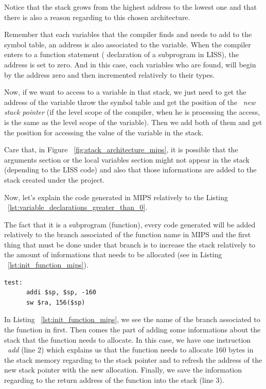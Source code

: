 \documentclass[
  oneside,
  11pt, a4paper,
  footinclude=true,
  headinclude=true,
  cleardoublepage=empty
]{scrbook}
\begin{document}
Notice that the stack grows from the highest address to the lowest one and that there is also a reason regarding to this chosen architecture.

Remember that each variables that the compiler finds and needs to add to the symbol table, an address is also associated to the variable. When the compiler enters to a function statement ( declaration of a subprogram in LISS), the address is set to zero. And in this case, each variables who are found, will begin by the address zero and then incremented relatively to their types.

Now, if we want to access to a variable in that stack, we just need to get the address of the variable throw the symbol table and get the position of the ~\textit{new stack pointer} (if the level scope of the compiler, when he is processing the access, is the same as the level scope of the variable). Then we add both of them and get the position for accessing the value of the variable in the stack.

Care that, in Figure ~\ref{fig:stack_architecture_mips}, it is possible that the arguments section or the local variables section might not appear in the stack (depending to the LISS code) and also that those informations are added to the stack created under the project.

Now, let's explain the code generated in MIPS relatively to the Listing ~\ref{lst:variable_declarations_greater_than_0}.

The fact that it is a subprogram (function), every code generated will be added relatively to the branch associated of the function name in MIPS and the first thing that must be done under that branch is to increase the stack relatively to the amount of informations that needs to be allocated (see in Listing ~\ref{lst:init_function_mips}).

\begin{lstlisting}[caption={Initialization of MIPS code generated for a function},label={lst:init_function_mips}]
    test: 
      addi $sp, $sp, -160		
      sw $ra, 156($sp)
\end{lstlisting}

In Listing ~\ref{lst:init_function_mips}, we see the name of the branch associated to the function in first. Then comes the part of adding some informations about the stack that the function needs to allocate. In this case, we have one instruction ~\textit{add} (line 2) which explains us that the function needs to allocate 160 bytes  in the stack memory regarding to the stack pointer and to refresh the address of the new stack pointer with the new allocation. Finally, we save the information regarding to the return address of the function into the stack (line 3).
\end{document}

